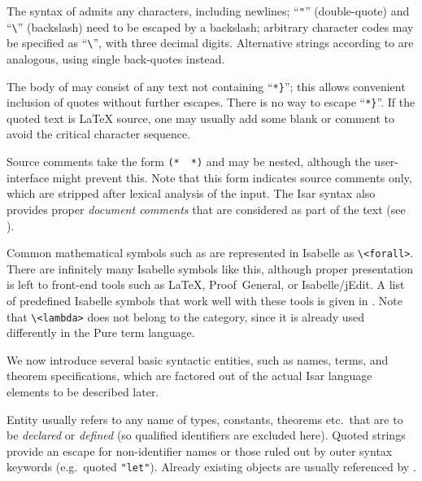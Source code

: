 \begin{isabellebody}
\begin{isamarkuptext}
  The syntax of \hyperlink{syntax.string}{\mbox{}} admits any characters, including
  newlines; ``\verb|"|'' (double-quote) and ``\verb|\|'' (backslash) need to be escaped by a backslash; arbitrary
  character codes may be specified as ``\verb|\|'',
  with three decimal digits.  Alternative strings according to
  \hyperlink{syntax.altstring}{\mbox{}} are analogous, using single back-quotes
  instead.

  The body of \hyperlink{syntax.verbatim}{\mbox{}} may consist of any text not
  containing ``\verb|*|\verb|}|''; this allows
  convenient inclusion of quotes without further escapes.  There is no
  way to escape ``\verb|*|\verb|}|''.  If the quoted
  text is {\LaTeX} source, one may usually add some blank or comment
  to avoid the critical character sequence.

  Source comments take the form \verb|(*|~~\verb|*)| and may be nested, although the user-interface
  might prevent this.  Note that this form indicates source comments
  only, which are stripped after lexical analysis of the input.  The
  Isar syntax also provides proper \emph{document comments} that are
  considered as part of the text (see ).

  Common mathematical symbols such as  are represented in
  Isabelle as \verb|\<forall>|.  There are infinitely many Isabelle
  symbols like this, although proper presentation is left to front-end
  tools such as {\LaTeX}, Proof~General, or Isabelle/jEdit.  A list of
  predefined Isabelle symbols that work well with these tools is given
  in .  Note that \verb|\<lambda>| does not belong
  to the  category, since it is already used differently
  in the Pure term language.%
\end{isamarkuptext}%
\isamarkuptrue%
%
\isamarkuptrue%
%
\begin{isamarkuptext}%
We now introduce several basic syntactic entities, such as names,
  terms, and theorem specifications, which are factored out of the
  actual Isar language elements to be described later.%
\end{isamarkuptext}%
\isamarkuptrue%
%
\isamarkuptrue%
%
\begin{isamarkuptext}%
Entity \hyperlink{syntax.name}{\mbox{}} usually refers to any name of types,
  constants, theorems etc.\ that are to be \emph{declared} or
  \emph{defined} (so qualified identifiers are excluded here).  Quoted
  strings provide an escape for non-identifier names or those ruled
  out by outer syntax keywords (e.g.\ quoted \verb|"let"|).
  Already existing objects are usually referenced by \hyperlink{syntax.nameref}{\mbox{}}.


\end{isamarkuptext}
\end{isabellebody}
